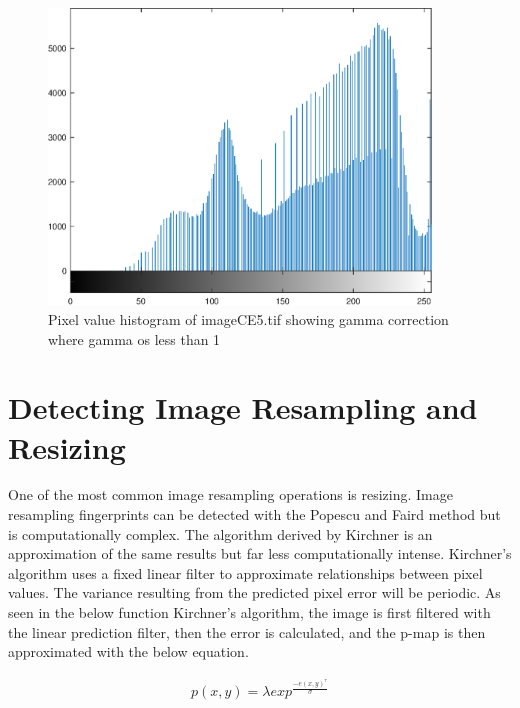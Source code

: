 \documentclass{article}
\begin{document}
\begin{figure}[H]
\centering
\includegraphics [width=4in]{lab6_06.eps}
\caption{Pixel value histogram of imageCE5.tif showing gamma correction
where gamma os less than 1}
\end{figure}


\section{Detecting Image Resampling and Resizing}

\qquad One of the most common image resampling operations is resizing. Image
resampling fingerprints can be detected with the Popescu and Faird method
but is computationally complex. The algorithm derived by Kirchner is an
approximation of the same results but far less computationally intense. 
Kirchner's algorithm uses a fixed linear filter to approximate relationships
between pixel values. The variance resulting from the predicted pixel error
will be periodic. As seen in the below function Kirchner's algorithm, the
image is first filtered with the linear prediction filter, then the error is
calculated, and the p-map is then approximated with the below equation. 
 
\begin{align} 
	p(x,y)=\lambda exp^{\frac{-e(x,y)^\tau}{\sigma}}
\end{align}
\end{document}
